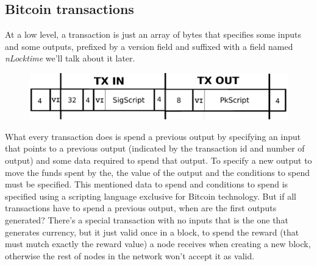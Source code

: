 \documentclass[12pt,journal,compsoc]{IEEEtran}
\begin{document}
\subsection{Bitcoin transactions}
At a low level, a transaction is just an array of bytes that specifies some inputs and some outputs, prefixed by a version field and suffixed with a field named \textit{nLocktime} we'll talk about it later.
\begin{figure}[h]
    \includegraphics[width=\linewidth]{img/tx_format.png}
\end{figure}
What every transaction does is spend a previous output by specifying an input that points to a previous output (indicated by the transaction id and number of output) and some data required to spend that output. To specify a new output to move the funds spent by the, the value of the output and the conditions to spend must be specified. This mentioned data to spend and conditions to spend is specified using a scripting language exclusive for Bitcoin technology\cite{bitcoin-wiki-script:online}. But if all transactions have to spend a previous output, when are the first outputs generated? There's a special transaction with no inputs that is the one that generates currency, but it just valid once in a block, to spend the reward (that must mutch exactly the reward value) a node receives when creating a new block, otherwise the rest of nodes in the network won't accept it as valid.
\end{document}
